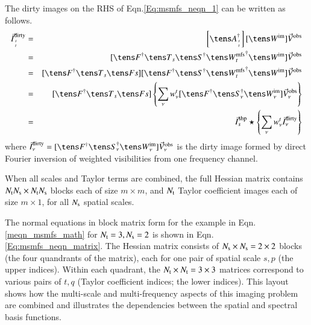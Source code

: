 \documentclass[11pt,a4paper,variablewidth]{article}
\begin{document}
\noindent The dirty images on the RHS of Eqn.\ref{Eq:msmfs_neqn_1} can be written as follows.
\begin{eqnarray}
\label{Eq:msmfs_neqn_3}
\vec{I}^{\rm dirty}_{{s}\atop{t}}  &=&  \left[\A_{{s}\atop{t}}^{\dag}\right][\Wim]  \vec{V}^{\rm obs}\\
&=& [\Fd \T_s \Sd\Wntd\Wim] \vec{V}^{\rm obs} \\
&=& [\Fd \T_s \F][\Fd\Sd\Wntd\Wim] \vec{V}^{\rm obs} \\
&=& [\Fd \T_s \F] \left\{  \sum_{\nu} \wnt [\Fd\Snd\Wimn] \vec{V}_{\nu}^{\rm obs}  \right\} \\
&=& \I^{\rm shp}_s \star \left\{\sum_{\nu} \wnt \vec{I}^{\rm dirty}_{\nu}  \right\} 
\label{Eq:msmfs_neqn_3a}
\end{eqnarray}
where ${\I}_{\nu}^{\rm dirty} = [\Fd \Snd \Wimn] \vec{V}^{\rm obs}_{\nu} $ is the dirty
image formed by direct Fourier inversion of weighted visibilities from one frequency channel.


When all scales and Taylor terms are combined, 
the full Hessian matrix contains
$N_{\rm t}  N_{\rm s}  \times N_{\rm t}  N_{\rm s} $ blocks each of size $m\times m$, 
and $N_{\rm t} $ Taylor coefficient images each of size $m\times 1$, 
for all $N_{\rm s} $ spatial scales.

The normal equations in block matrix form for the example 
in Eqn.\ref{meqn_msmfs_math} for $N_{\rm t} =3, N_{\rm s} =2$ is shown
in Eqn.\ref{Eq:msmfs_neqn_matrix}.
The Hessian matrix consists of $N_{\rm s} \times N_{\rm s} =2\times 2$ blocks 
(the four quandrants of the matrix), each for one pair of spatial scale $s,p$ (the upper indices).
Within each quadrant, the $N_{\rm t} \times N_{\rm t}  = 3\times 3$
matrices correspond to various pairs of $t,q$ (Taylor coefficient indices; the lower indices).
This layout shows how the multi-scale and multi-frequency aspects of
this imaging problem are combined and illustrates the 
dependencies between the spatial and spectral basis functions.
\end{document}
